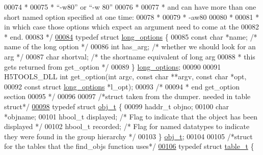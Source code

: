 \begin{DoxyCode}
00074 \textcolor{comment}{ *}
00075 \textcolor{comment}{ *   ``-w80'' or ``-w 80''}
00076 \textcolor{comment}{ *}
00077 \textcolor{comment}{ * and can have more than one short named option specified at one time:}
00078 \textcolor{comment}{ *}
00079 \textcolor{comment}{ *   -aw80}
00080 \textcolor{comment}{ *}
00081 \textcolor{comment}{ * in which case those options which expect an argument need to come at the}
00082 \textcolor{comment}{ * end.}
00083 \textcolor{comment}{ */}
\hyperlink{structlong__options}{00084} \textcolor{keyword}{typedef} \textcolor{keyword}{struct }\hyperlink{structlong__options}{long\_options} \{
00085     \textcolor{keyword}{const} \textcolor{keywordtype}{char}  *name;          \textcolor{comment}{/* name of the long option              */}
00086     \textcolor{keywordtype}{int}          has\_arg;       \textcolor{comment}{/* whether we should look for an arg    */}
00087     \textcolor{keywordtype}{char}         shortval;      \textcolor{comment}{/* the shortname equivalent of long arg}
00088 \textcolor{comment}{                                 * this gets returned from get\_option   */}
00089 \} \hyperlink{structlong__options}{long\_options};
00090 
00091 H5TOOLS\_DLL \textcolor{keywordtype}{int}    get\_option(\textcolor{keywordtype}{int} argc, \textcolor{keyword}{const} \textcolor{keywordtype}{char} **argv, \textcolor{keyword}{const} \textcolor{keywordtype}{char} *opt,
00092                          \textcolor{keyword}{const} \textcolor{keyword}{struct} \hyperlink{structlong__options}{long\_options} *l\_opt);
00093 \textcolor{comment}{/*}
00094 \textcolor{comment}{ * end get\_option section}
00095 \textcolor{comment}{ */}
00096 
00097 \textcolor{comment}{/*struct taken from the dumper. needed in table struct*/}
\hyperlink{structobj__t}{00098} \textcolor{keyword}{typedef} \textcolor{keyword}{struct }\hyperlink{structobj__t}{obj\_t} \{
00099     haddr\_t objno;
00100     \textcolor{keywordtype}{char} *objname;
00101     hbool\_t displayed;          \textcolor{comment}{/* Flag to indicate that the object has been displayed */}
00102     hbool\_t recorded;           \textcolor{comment}{/* Flag for named datatypes to indicate they were found in the group
       hierarchy */}
00103 \} \hyperlink{structobj__t}{obj\_t};
00104 
00105 \textcolor{comment}{/*struct for the tables that the find\_objs function uses*/}
\hyperlink{structtable__t}{00106} \textcolor{keyword}{typedef} \textcolor{keyword}{struct }\hyperlink{structtable__t}{table\_t} \{

\end{DoxyCode}
